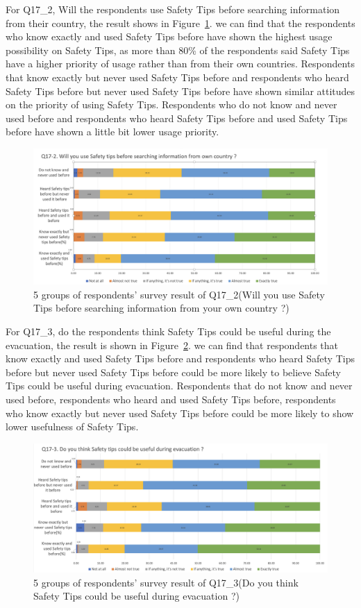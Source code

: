 For Q17\_2, Will the respondents use Safety Tips before searching information from their country, the result shows in Figure~\ref{fig20}. we can find that the respondents who know exactly and used Safety Tips before have shown the highest usage possibility on Safety Tips, as more than 80\% of the respondents said Safety Tips have a higher priority of usage rather than from their own countries. Respondents that know exactly but never used Safety Tips before and respondents who heard Safety Tips before but never used Safety Tips before have shown similar attitudes on the priority of using Safety Tips. Respondents who do not know and never used before and respondents who heard Safety Tips before and used Safety Tips before have shown a little bit lower usage priority. 

\begin{figure}[h]
  \includegraphics[width=0.8\linewidth]{Figure/Figure20.jpg}
  \centering
  \caption[5 groups of respondents' survey result of Q17\_2]{5 groups of respondents' survey result of Q17\_2(Will you use Safety Tips before searching information from your own country ?)}
  \label{fig20}
\end{figure}

For Q17\_3, do the respondents think Safety Tips could be useful during the evacuation, the result is shown in Figure~\ref{fig21}. we can find that respondents that know exactly and used Safety Tips before and respondents who heard Safety Tips before but never used Safety Tips before could be more likely to believe Safety Tips could be useful during evacuation. Respondents that do not know and never used before, respondents who heard and used Safety Tips before, respondents who know exactly but never used Safety Tips before could be more likely to show lower usefulness of Safety Tips. 

\begin{figure}[h]
  \includegraphics[width=0.8\linewidth]{Figure/Figure21.jpg}
  \centering
  \caption[5 groups of respondents' survey result of Q17\_3]{5 groups of respondents' survey result of Q17\_3(Do you think Safety Tips could be useful during evacuation ?)}
  \label{fig21}
\end{figure}

